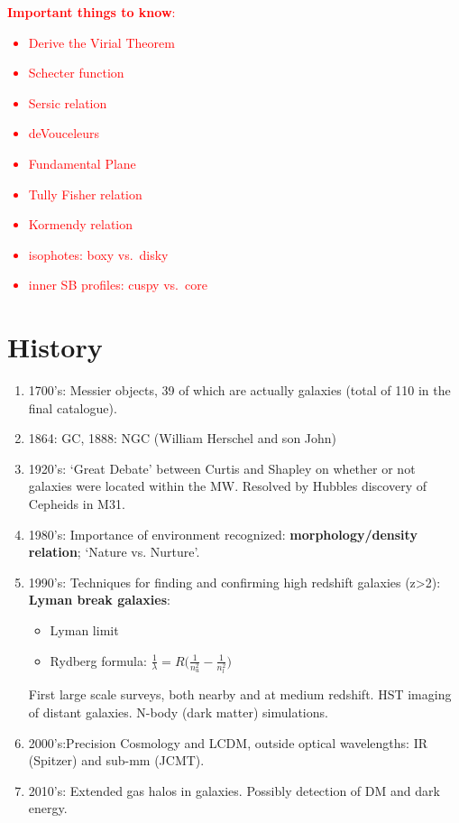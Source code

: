 \documentclass[12pt]{article}
\begin{document}
\textcolor{red}{\textbf{Important things to know}:
\begin{itemize}
    \item Derive the Virial Theorem
    \item Schecter function
    \item Sersic relation
    \item deVouceleurs
    \item Fundamental Plane
    \item Tully Fisher relation
    \item Kormendy relation
    \item isophotes: boxy vs.\ disky
    \item inner SB profiles: cuspy vs.\ core
\end{itemize}
}

\section{History}
\begin{enumerate}
  \item 1700's: Messier objects, 39 of
  which are actually galaxies (total of 110 in the final catalogue).
  \item 1864: GC, 1888: NGC (William Herschel and son John)
  \item 1920's: `Great Debate' between Curtis and Shapley on whether
  or not galaxies were located within the MW\@. Resolved by Hubbles
  discovery of Cepheids in M31.
  \item 1980's: Importance of environment recognized:
  \textbf{morphology/density relation}; `Nature vs. Nurture'.
  \item 1990's: Techniques for finding and confirming high redshift
  galaxies (z>2): \textbf{Lyman break galaxies}:
  \begin{itemize}
    \item Lyman limit
    \item Rydberg formula: $\frac{1}{\lambda}=
    R\Big(\frac{1}{n_u^2}-\frac{1}{n_l^2}\Big) $
  \end{itemize}
  First large scale surveys, both nearby and at medium redshift. HST
  imaging of distant galaxies. N-body (dark matter) simulations.
  \item 2000's:Precision Cosmology and LCDM, outside optical
  wavelengths: IR (Spitzer) and sub-mm (JCMT).
  \item 2010's: Extended gas halos in galaxies. Possibly detection of
  DM and dark energy.
\end{enumerate}
\end{document}
